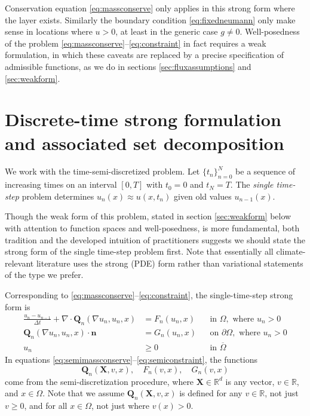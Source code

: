 \documentclass[final,leqno,onefignum,onetabnum]{siamltex1213bueler}
\newcommand\bn{\mathbf{n}}
\newcommand\bQ{\mathbf{Q}}
\newcommand\bX{\mathbf{X}}
\newcommand{\Div}{\nabla\cdot}
\renewcommand{\grad}{\nabla}
\newcommand\RR{\mathbb{R}}
\begin{document}
Conservation equation \eqref{eq:massconserve} only applies in this strong form where the layer exists.  Similarly the boundary condition \eqref{eq:fixedneumann} only make sense in locations where $u>0$, at least in the generic case $g\ne 0$.  Well-posedness of the problem \eqref{eq:massconserve}--\eqref{eq:constraint} in fact requires a weak formulation, in which these caveats are replaced by a precise specification of admissible functions, as we do in sections \ref{sec:fluxassumptions} and \ref{sec:weakform}.


\section{Discrete-time strong formulation and associated set decomposition}  \label{sec:discreteform}

We work with the time-semi-discretized problem.  Let $\{t_n\}_{n=0}^N$ be a sequence of increasing times on an interval $[0,T]$ with $t_0=0$ and $t_N=T$.  The \emph{single time-step} problem determines $u_n(x) \approx u(x,t_n)$ given old values $u_{n-1}(x)$.

Though the weak form of this problem, stated in section \ref{sec:weakform} below with attention to function spaces and well-posedness, is more fundamental, both tradition and the developed intuition of practitioners suggests we should state the strong form of the single time-step problem first.  Note that essentially all climate-relevant literature uses the strong (PDE) form rather than variational statements of the type we prefer.

Corresponding to \eqref{eq:massconserve}--\eqref{eq:constraint}, the single-time-step strong form is
\begin{align}
\frac{u_n - u_{n-1}}{\Delta t} + \Div \bQ_n(\grad u_n,u_n,x) &= F_n(u_n,x) &&\text{in } \Omega, \text{ where } u_n > 0 \label{eq:semimassconserve} \\
\bQ_n(\grad u_n,u_n,x) \cdot \bn &= G_n(u_n,x) &&\text{on } \partial\Omega, \text{ where } u_n > 0 \label{eq:semifixedneumann} \\
u_n &\ge 0 &&\text{in } \overline{\Omega} \label{eq:semiconstraint}
\end{align}
In equations \eqref{eq:semimassconserve}--\eqref{eq:semiconstraint}, the functions
\begin{equation}
\bQ_n(\bX,v,x), \quad F_n(v,x), \quad G_n(v,x)\label{eq:functionalforms}
\end{equation}
come from the semi-discretization procedure, where $\bX\in\RR^d$ is any vector, $v\in\RR$, and $x\in \Omega$.  Note that we assume $\bQ_n(\bX,v,x)$ is defined for any $v\in\RR$, not just $v\ge 0$, and for all $x\in\Omega$, not just where $v(x)>0$.
\end{document}
